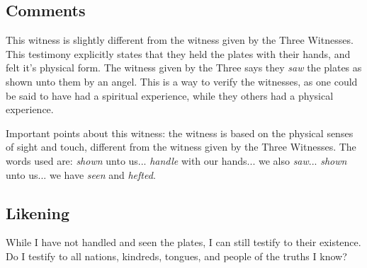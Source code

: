 \documentclass[12pt]{report}
\begin{document}
\subsection{Comments\label{8witness:comments}}
This witness is slightly different from the witness given by the Three Witnesses.  This testimony explicitly states that they held the plates with their hands, and felt it's physical form.  The witness given by the Three says they \emph{saw} the plates as shown unto them by an angel.  This is a way to verify the witnesses, as one could be said to have had a spiritual experience, while they others had a physical experience.

Important points about this witness: the witness is based on the physical senses of sight and touch, different from the witness given by the Three Witnesses.  The words used are: \emph{shown} unto us... \emph{handle} with our hands... we also \emph{saw}... \emph{shown} unto us... we have \emph{seen} and \emph{hefted}.

\subsection{Likening\label{8witness:likening}}
While I have not handled and seen the plates, I can still testify to their existence. Do I testify to all nations, kindreds, tongues, and people of the truths I know?
\end{document}
